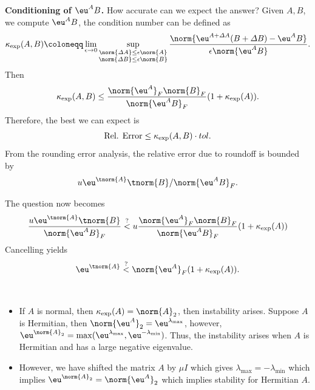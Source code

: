 \documentclass{article}
\begin{document}
\textbf{Conditioning of $\eu^AB$. }How accurate can we expect the
answer? Given $A,B$, we compute $\eu^AB$, the condition number can be
defined as 
\begin{equation}\notag
    \kappa_{\exp}(A,B) \coloneqq \lim_{\epsilon\to 0}\sup_{\substack{\norm{\varDelta A} \leq \epsilon \norm{A} \\ \norm{\varDelta B} \leq \epsilon \norm{B}}} 
    \frac{\norm{\eu^{A+\varDelta A}(B+\varDelta B) - \eu^A B}}{\epsilon \norm{\eu^AB}}.
\end{equation}
Then 
\begin{equation}\notag
    \kappa_{\exp}(A,B) \leq \frac{\norm{\eu^A}_F\norm{B}_F}{\norm{\eu^A B}_F}(1+\kappa_{\exp}(A)).
\end{equation}
Therefore, the best we can expect is 
\begin{equation}\notag
    \text{Rel. Error} \leq \kappa_{\exp}(A,B) \cdot tol.
\end{equation}
From the rounding error analysis, the relative error due to roundoff is
bounded by 
\begin{equation}\notag
    u\eu^{\tnorm{A}}\tnorm{B} / \norm{\eu^AB}_F.
\end{equation}

The question now becomes 
\begin{equation}\notag
    \frac{u\eu^{\tnorm{A}}\tnorm{B}}{\norm{\eu^AB}_F} \stackrel{?}{<} u
    \frac{\norm{\eu^A}_F\norm{B}_F}{\norm{\eu^AB}_F}(1+\kappa_{\exp}(A))
\end{equation}
Cancelling yields
\begin{equation}\notag
    \eu^{\tnorm{A}}\stackrel{?}{<} \norm{\eu^A}_F(1+\kappa_{\exp}(A)).
\end{equation}

\begin{remark}
    \ 
    \begin{itemize}
        \item If $A$ is normal, then $\kappa_{\exp}(A) = \norm{A}_2$,
        then instability arises. Suppose $A$ is Hermitian, then
        $\norm{\eu^A}_2 = \eu^{\lambda_{\max}}$, however,
        $\eu^{\norm{A}_2} =
        \max(\eu^{\lambda_{\max}},\eu^{-\lambda_{\min}})$. Thus, the
        instability arises when $A$ is Hermitian and has a large
        negative eigenvalue. 
        \item However, we have shifted the matrix $A$ by $\mu I$ which
        gives $\lambda_{\max} = -\lambda_{\min}$ which implies
        $\eu^{\norm{A}_2} = \norm{\eu^A}_2$ which implies stability for
        Hermitian $A$.
    \end{itemize}
\end{remark}
\end{document}
